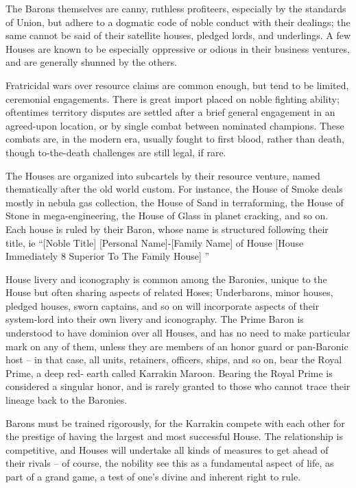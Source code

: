 The Barons themselves are canny, ruthless profiteers, especially by the standards of Union, but
adhere to a dogmatic code of noble conduct with their dealings; the same cannot be said of their
satellite houses, pledged lords, and underlings. A few Houses are known to be especially
oppressive or odious in their business ventures, and are generally shunned by the others.





Fratricidal wars over resource claims are common enough, but tend to be limited, ceremonial
engagements. There is great import placed on noble fighting ability; oftentimes territory disputes
are settled after a brief general engagement in an agreed-upon location, or by single combat
between nominated champions. These combats are, in the modern era, usually fought to first
blood, rather than death, though to-the-death challenges are still legal, if rare.


The Houses are organized into subcartels by their resource venture, named thematically after the
old world custom. For instance, the House of Smoke deals mostly in nebula gas collection, the
House of Sand in terraforming, the House of Stone in mega-engineering, the House of Glass in
planet cracking, and so on. Each house is ruled by their Baron, whose name is structured
following their title, ie “[Noble Title] [Personal Name]-[Family Name] of House [House Immediately
                                      8
Superior To The Family House] ”


House livery and iconography is common among the Baronies, unique to the House but often
sharing aspects of related Hoses; Underbarons, minor houses, pledged houses, sworn captains,
and so on will incorporate aspects of their system-lord into their own livery and iconography. The
Prime Baron is understood to have dominion over all Houses, and has no need to make
particular mark on any of them, unless they are members of an honor guard or pan-Baronic host
-- in that case, all units, retainers, officers, ships, and so on, bear the Royal Prime, a deep red-
earth called Karrakin Maroon. Bearing the Royal Prime is considered a singular honor, and is
rarely granted to those who cannot trace their lineage back to the Baronies.


Barons must be trained rigorously, for the Karrakin compete with each other for the prestige of
having the largest and most successful House. The relationship is competitive, and Houses will
undertake all kinds of measures to get ahead of their rivals -- of course, the nobility see this as a
fundamental aspect of life, as part of a grand game, a test of one’s divine and inherent right to
rule.


